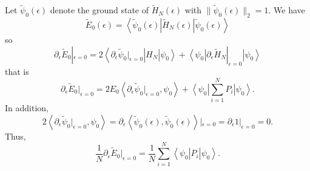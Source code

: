 \documentclass{ian}
\begin{document}
Let $\tilde\psi_0(\epsilon)$ denote the ground state of $\tilde H_N(\epsilon)$ with $\|\tilde\psi_0(\epsilon)\|_2=1$.
We have
\begin{equation}
  \tilde E_0(\epsilon)
  =\left<\tilde\psi_0(\epsilon)\right|\tilde H_N(\epsilon)\left|\tilde\psi_0(\epsilon)\right>
\end{equation}
so
\begin{equation}
  \partial_\epsilon\tilde E_0|_{\epsilon=0}
  =
  2\left<\partial_\epsilon\tilde\psi_0|_{\epsilon=0}\right|H_N\left|\psi_0\right>
  +
  \left<\psi_0\right|\partial_\epsilon\tilde H_N|_{\epsilon=0}\left|\psi_0\right>
\end{equation}
that is
\begin{equation}
  \partial_\epsilon\tilde E_0|_{\epsilon=0}
  =
  2E_0\left<\partial_\epsilon\tilde\psi_0|_{\epsilon=0},\psi_0\right>
  +
  \left<\psi_0\right|\sum_{i=1}^NP_i\left|\psi_0\right>
  .
\end{equation}
In addition,
\begin{equation}
  2\left<\partial_\epsilon\tilde\psi_0|_{\epsilon=0},\psi_0\right>
  =
  \partial_\epsilon\left<\tilde\psi_0(\epsilon),\tilde\psi_0(\epsilon)\right>|_{\epsilon=0}
  =
  \partial_\epsilon1|_{\epsilon=0}
  =0
  .
\end{equation}
Thus,
\begin{equation}
  \frac1N
  \partial_\epsilon\tilde E_0|_{\epsilon=0}
  =
  \frac1N\sum_{i=1}^N\left<\psi_0\right|P_i\left|\psi_0\right>
  .
\end{equation}
\end{document}
